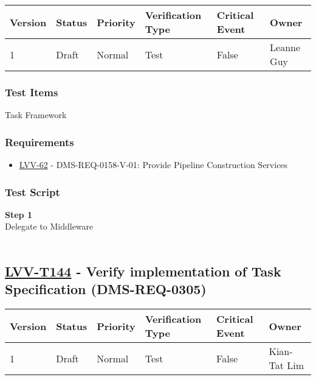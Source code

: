 \begin{longtable}[]{@{}llllll@{}}
\toprule
Version & Status & Priority & Verification Type & Critical Event &
Owner\tabularnewline
\midrule
\endhead
1 & Draft & Normal & Test & False & Leanne Guy\tabularnewline
\bottomrule
\end{longtable}

\hypertarget{test-items-119}{%
\subsubsection{Test Items}\label{test-items-119}}

Task Framework~

\hypertarget{requirements-120}{%
\subsubsection{Requirements}\label{requirements-120}}

\begin{itemize}
\tightlist
\item
  \href{https://jira.lsstcorp.org/browse/LVV-62}{LVV-62} -
  DMS-REQ-0158-V-01: Provide Pipeline Construction Services
\end{itemize}

\hypertarget{test-script-120}{%
\subsubsection{Test Script}\label{test-script-120}}

\textbf{Step 1}\\
Delegate to Middleware\\
~\\

\hypertarget{lvv-t144---verify-implementation-of-task-specification-dms-req-0305}{%
\subsection{\texorpdfstring{\href{https://jira.lsstcorp.org/secure/Tests.jspa\#/testCase/LVV-T144}{LVV-T144}
- Verify implementation of Task Specification
(DMS-REQ-0305)}{LVV-T144 - Verify implementation of Task Specification (DMS-REQ-0305)}}\label{lvv-t144---verify-implementation-of-task-specification-dms-req-0305}}

\begin{longtable}[]{@{}llllll@{}}
\toprule
Version & Status & Priority & Verification Type & Critical Event &
Owner\tabularnewline
\midrule
\endhead
1 & Draft & Normal & Test & False & Kian-Tat Lim\tabularnewline
\bottomrule
\end{longtable}

